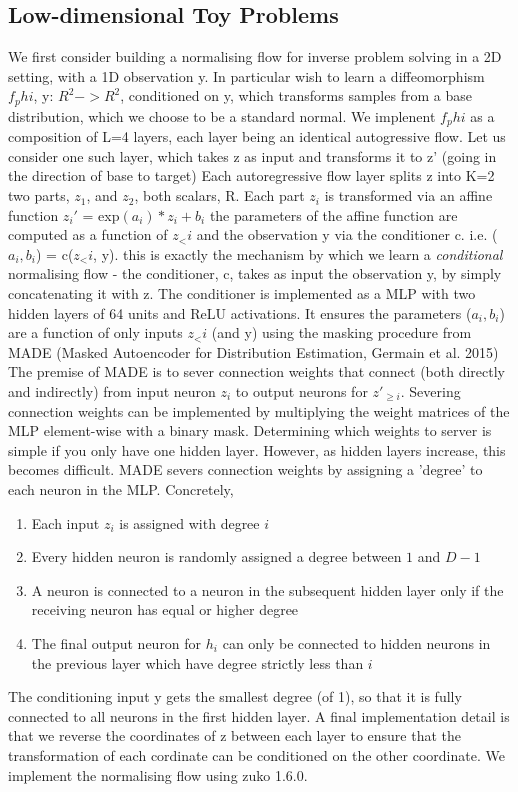 \documentclass[12pt,a4paper]{report}
\begin{document}
\subsection{Low-dimensional Toy Problems}
\label{subsec:2D_NF_architecture}
We first consider building a normalising flow for inverse problem solving in a 2D setting, with a 1D observation y. 
In particular wish to learn a diffeomorphism $f_phi$, y: $R^2 -> R^2$, conditioned on y, which transforms samples from a base distribution, which we choose to be a standard normal. 
We implenent $f_phi$ as a composition of L=4 layers, each layer being an identical autogressive flow. 
Let us consider one such layer, which takes z as input and transforms it to z' (going in the direction of base to target)
Each autoregressive flow layer splits z into K=2 two parts, $z_1$, and $z_2$, both scalars, R. 
Each part $z_i$ is transformed via an affine function 
$z_i'$ = exp$(a_i) * z_i + b_i$
the parameters of the affine function are computed as a function of $z_<i$ and the observation y via the conditioner c. 
i.e. ($a_i, b_i$) = c($z_<i$, y).
this is exactly the mechanism by which we learn a \emph{conditional} normalising flow - the conditioner, c, takes as input the observation y, by simply concatenating it with z. 
The conditioner is implemented as a MLP with two hidden layers of 64 units and ReLU activations. 
It ensures the parameters ($a_i, b_i$) are a function of only inputs $z_<i$ (and y) using the masking procedure from MADE (Masked Autoencoder for Distribution Estimation, Germain et al. 2015)
The premise of MADE is to sever connection weights that connect (both directly and indirectly) from input neuron $z_i$ to output neurons for $z'_{\geq i}$. Severing connection weights can be implemented by multiplying the weight matrices of the MLP element-wise with a binary mask. 
Determining which weights to server is simple if you only have one hidden layer. However, as hidden layers increase, this becomes difficult. MADE severs connection weights by assigning a 'degree' to each neuron in the MLP. Concretely, 
\begin{enumerate}
    \item Each input $z_i$ is assigned with degree $i$
    \item Every hidden neuron is randomly assigned a degree between $1$ and $D-1$
    \item A neuron is connected to a neuron in the subsequent hidden layer only if the receiving neuron has equal or higher degree 
    \item The final output neuron for $h_i$ can only be connected to hidden neurons in the previous layer which have degree strictly less than $i$
\end{enumerate}
The conditioning input y gets the smallest degree (of 1), so that it is fully connected to all neurons in the first hidden layer. 
A final implementation detail is that we reverse the coordinates of z between each layer to ensure that the transformation of each cordinate can be conditioned on the other coordinate. 
We implement the normalising flow using zuko 1.6.0. 
\end{document}
